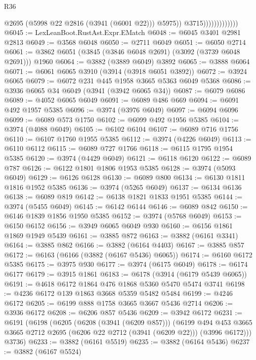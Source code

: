 \begin{lexlean}{R36}
\begin{coremodule}
                                  @2695
                                  (@5998 @22 @2816 (@3941 (@6001 @22)))
                                  @5975))
                              @3715)))))))))))))
@6045 := LexLeanBoot.RustAst.Expr.EMatch
@6048 := @6045 @3401 @2981 @2813
@6049 := @3568 @6048
@6050 := @2711 @6049
@6051 := @6050 @2714
@6061 := @3862 @6051 (@3845 (@3846 @6048 @2691) (@3092 (@3739 @6048 @2691))) @1960
@6064 := @3882 (@3889 @6049) @3892
@6065 := @3888 @6064
@6071 := @6061 @6065 @3910 (@3914 (@3918 @6051 @3892))
@6072 := @3924 @6065
@6079 := @6072 @231 @445 @1958 @3665 @5363 @6049 @5368
@6086 := @3936 @6065 @34 @6049 (@3941 (@3942 @6065 @34))
@6087 := @6079 @6086
@6089 := @4052 @6065 @6049
@6091 := @6089 @486 @669
@6094 := @6091 @492 @1957 @5385
@6096 := @3974 (@3976 @6049)
@6097 := @6094 @6096
@6099 := @6089 @573 @1750
@6102 := @6099 @492 @1956 @5385
@6104 := @3974 (@4088 @6049)
@6105 := @6102 @6104
@6107 := @6089 @716 @1756
@6110 := @6107 @1760 @1955 @5385
@6112 := @3974 (@4226 @6049)
@6113 := @6110 @6112
@6115 := @6089 @727 @1766
@6118 := @6115 @1795 @1954 @5385
@6120 := @3974 (@4429 @6049)
@6121 := @6118 @6120
@6122 := @6089 @787
@6126 := @6122 @1801 @1806 @1953 @5385
@6128 := @3974 (@5093 @6049)
@6129 := @6126 @6128
@6130 := @6089 @800
@6134 := @6130 @1811 @1816 @1952 @5385
@6136 := @3974 (@5265 @6049)
@6137 := @6134 @6136
@6138 := @6089 @819
@6142 := @6138 @1821 @1833 @1951 @5385
@6144 := @3974 (@5455 @6049)
@6145 := @6142 @6144
@6146 := @6089 @842
@6150 := @6146 @1839 @1856 @1950 @5385
@6152 := @3974 (@5768 @6049)
@6153 := @6150 @6152
@6156 := @3949 @6065 @6049 @930
@6160 := @6156 @1861 @1869 @1949 @5439
@6161 := @3885 @872
@6163 := @3882 (@6161 @3341)
@6164 := @3885 @862
@6166 := @3882 (@6164 @4403)
@6167 := @3885 @857
@6172 := @6163 (@6166 (@3882 (@6167 @5436) @6065))
@6174 := @6160 @6172 @5385
@6175 := @3975 @930
@6177 := @3974 (@6175 @6049)
@6178 := @6174 @6177
@6179 := @3915 @1861
@6183 := @6178 (@3914 (@6179 @5439 @6065))
@6191 := @4618 @6172 @1864 @476 @1868 @5360 @5470 @5474 @3741
@6198 := @4236 @6172 @139 @1863 @3668 @5359 @5482 @5484
@6199 := @4246 @6172
@6205 := @6199 @888 @1758 @3665 @3667 @5436 @2714
@6206 := @3936 @6172
@6208 := @6206 @857 @5436
@6209 := @3942 @6172
@6231 := @6191
    (@6198
      (@6205
        (@6208 (@3941 (@6209 @857)))
        (@6199
          @494
          @453
          @3665
          @3665
          @2712
          @2695
          (@6206 @22 @2712 (@3941 (@6209 @22)))
          (@3996 @6172)))
      @3736)
@6233 := @3882 (@6161 @5519)
@6235 := @3882 (@6164 @5436)
@6237 := @3882 (@6167 @5524)

\end{coremodule}
\end{lexlean}
